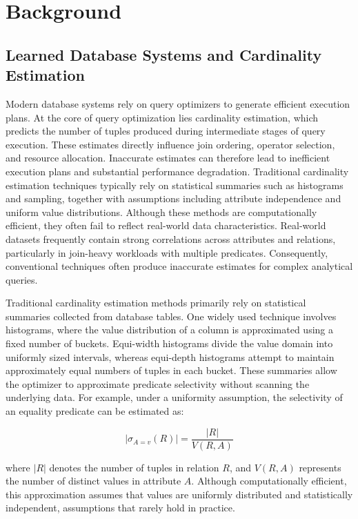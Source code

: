 \chapter{Background}
\label{chap:background}
\pagestyle{plain}

\section{Learned Database Systems and Cardinality Estimation}

Modern database systems rely on query optimizers to generate efficient execution plans. At the core of query optimization lies cardinality estimation, which predicts the number of tuples produced during intermediate stages of query execution\cite{HE2024102854}. These estimates directly influence join ordering, operator selection, and resource allocation. Inaccurate estimates can therefore lead to inefficient execution plans and substantial performance degradation. Traditional cardinality estimation techniques typically rely on statistical summaries such as histograms and sampling, together with assumptions including attribute independence and uniform value distributions. Although these methods are computationally efficient, they often fail to reflect real-world data characteristics. Real-world datasets frequently contain strong correlations across attributes and relations, particularly in join-heavy workloads with multiple predicates. Consequently, conventional techniques often produce inaccurate estimates for complex analytical queries.

Traditional cardinality estimation methods primarily rely on statistical summaries collected from database tables. One widely used technique involves histograms, where the value distribution of a column is approximated using a fixed number of buckets\cite{yi2025monomenhancingmonotonicitylearned}. Equi-width histograms divide the value domain into uniformly sized intervals, whereas equi-depth histograms attempt to maintain approximately equal numbers of tuples in each bucket. These summaries allow the optimizer to approximate predicate selectivity without scanning the underlying data. For example, under a uniformity assumption, the selectivity of an equality predicate can be estimated as:

\begin{equation}
|\sigma_{A=v}(R)| = \frac{|R|}{V(R,A)}
\end{equation}

where $|R|$ denotes the number of tuples in relation $R$, and $V(R,A)$ represents the number of distinct values in attribute $A$. Although computationally efficient, this approximation assumes that values are uniformly distributed and statistically independent, assumptions that rarely hold in practice.

